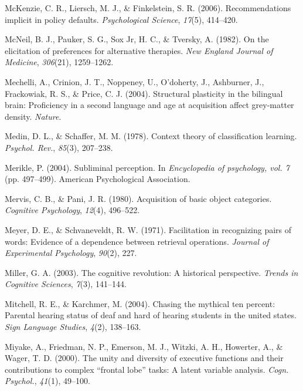 \documentclass[
]{krantz}
\newlength{\cslhangindent}
\newenvironment{CSLReferences}[2] %
 {\begin{list}{}{%
  \setlength{\itemindent}{0pt}
  \setlength{\leftmargin}{0pt}
  \setlength{\parsep}{0pt}
  \ifodd #1
   \setlength{\leftmargin}{\cslhangindent}
   \setlength{\itemindent}{-1\cslhangindent}
  \fi
  \setlength{\itemsep}{#2\baselineskip}}}
 {\end{list}}
\begin{document}
\begin{CSLReferences}{1}{0}
McKenzie, C. R., Liersch, M. J., \& Finkelstein, S. R. (2006). Recommendations implicit in policy defaults. \emph{Psychological Science}, \emph{17}(5), 414--420.

McNeil, B. J., Pauker, S. G., Sox Jr, H. C., \& Tversky, A. (1982). On the elicitation of preferences for alternative therapies. \emph{New England Journal of Medicine}, \emph{306}(21), 1259--1262.

Mechelli, A., Crinion, J. T., Noppeney, U., O'doherty, J., Ashburner, J., Frackowiak, R. S., \& Price, C. J. (2004). Structural plasticity in the bilingual brain: Proficiency in a second language and age at acquisition affect grey-matter density. \emph{Nature}.

Medin, D. L., \& Schaffer, M. M. (1978). Context theory of classification learning. \emph{Psychol. Rev.}, \emph{85}(3), 207--238.

Merikle, P. (2004). Subliminal perception. In \emph{Encyclopedia of psychology, vol. 7} (pp. 497--499). American Psychological Association.

Mervis, C. B., \& Pani, J. R. (1980). Acquisition of basic object categories. \emph{Cognitive Psychology}, \emph{12}(4), 496--522.

Meyer, D. E., \& Schvaneveldt, R. W. (1971). Facilitation in recognizing pairs of words: Evidence of a dependence between retrieval operations. \emph{Journal of Experimental Psychology}, \emph{90}(2), 227.

Miller, G. A. (2003). The cognitive revolution: A historical perspective. \emph{Trends in Cognitive Sciences}, \emph{7}(3), 141--144.

Mitchell, R. E., \& Karchmer, M. (2004). Chasing the mythical ten percent: Parental hearing status of deaf and hard of hearing students in the united states. \emph{Sign Language Studies}, \emph{4}(2), 138--163.

Miyake, A., Friedman, N. P., Emerson, M. J., Witzki, A. H., Howerter, A., \& Wager, T. D. (2000). The unity and diversity of executive functions and their contributions to complex {``frontal lobe''} tasks: A latent variable analysis. \emph{Cogn. Psychol.}, \emph{41}(1), 49--100.


\end{CSLReferences}
\end{document}
